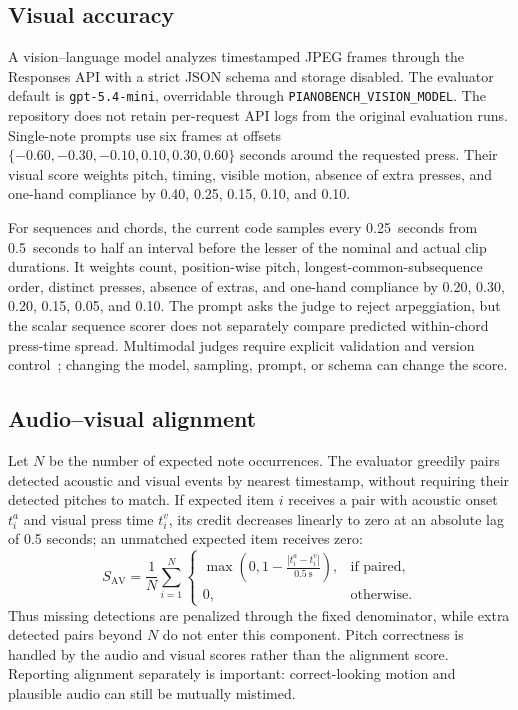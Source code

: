 \documentclass{article}
\begin{document}
\subsection{Visual accuracy}

A vision--language model analyzes timestamped JPEG frames through the Responses API with a strict JSON schema and storage disabled. The evaluator default is \texttt{gpt-5.4-mini}, overridable through \texttt{PIANOBENCH\_VISION\_MODEL}. The repository does not retain per-request API logs from the original evaluation runs. Single-note prompts use six frames at offsets $\{-0.60,-0.30,-0.10,0.10,0.30,0.60\}$ seconds around the requested press. Their visual score weights pitch, timing, visible motion, absence of extra presses, and one-hand compliance by 0.40, 0.25, 0.15, 0.10, and 0.10.

For sequences and chords, the current code samples every 0.25~seconds from 0.5~seconds to half an interval before the lesser of the nominal and actual clip durations. It weights count, position-wise pitch, longest-common-subsequence order, distinct presses, absence of extras, and one-hand compliance by 0.20, 0.30, 0.20, 0.15, 0.05, and 0.10. The prompt asks the judge to reject arpeggiation, but the scalar sequence scorer does not separately compare predicted within-chord press-time spread. Multimodal judges require explicit validation and version control~\citep{chen2024mllmjudge}; changing the model, sampling, prompt, or schema can change the score.

\subsection{Audio--visual alignment}

Let $N$ be the number of expected note occurrences. The evaluator greedily pairs detected acoustic and visual events by nearest timestamp, without requiring their detected pitches to match. If expected item $i$ receives a pair with acoustic onset $t_i^a$ and visual press time $t_i^v$, its credit decreases linearly to zero at an absolute lag of 0.5 seconds; an unmatched expected item receives zero:
\begin{equation}
  S_{\mathrm{AV}}
  = \frac{1}{N}\sum_{i=1}^{N}
  \begin{cases}
    \max\!\left(0, 1 - \frac{|t_i^a-t_i^v|}{0.5\ \mathrm{s}}\right), & \text{if paired},\\
    0, & \text{otherwise}.
  \end{cases}
  \label{eq:av-score}
\end{equation}
Thus missing detections are penalized through the fixed denominator, while extra detected pairs beyond $N$ do not enter this component. Pitch correctness is handled by the audio and visual scores rather than the alignment score. Reporting alignment separately is important: correct-looking motion and plausible audio can still be mutually mistimed.
\end{document}
